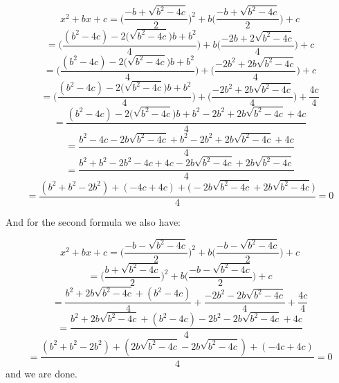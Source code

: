 \documentclass{article}
\begin{document}
\begin{equation*}
	x^{2} + bx + c = \Bigg(\frac{-b + \sqrt{b^{2} - 4c}}{2}\Bigg)^{2} + b\Bigg(\frac{-b + \sqrt{b^{2} - 4c}}{2}\Bigg) + c
\end{equation*}
\begin{equation*}
	= \Bigg(\frac{(b^{2} - 4c) - 2\Big(\sqrt{b^{2} - 4c}\Big)b + b^{2}}{4}\Bigg) + b\Bigg(\frac{-2b + 2\sqrt{b^{2} - 4c}}{4}\Bigg) + c
\end{equation*}
\begin{equation*}
	= \Bigg(\frac{(b^{2} - 4c) - 2\Big(\sqrt{b^{2} - 4c}\Big)b + b^{2}}{4}\Bigg) + \Bigg(\frac{-2b^{2} + 2b\sqrt{b^{2} - 4c}}{4}\Bigg) + c
\end{equation*}
\begin{equation*}
	= \Bigg(\frac{(b^{2} - 4c) - 2\Big(\sqrt{b^{2} - 4c}\Big)b + b^{2}}{4}\Bigg) + \Bigg(\frac{-2b^{2} + 2b\sqrt{b^{2} - 4c}}{4}\Bigg) + \frac{4c}{4}
\end{equation*}
\begin{equation*}
	= \frac{(b^{2} - 4c) - 2\Big(\sqrt{b^{2} - 4c}\Big)b + b^{2} - 2b^{2} + 2b\sqrt{b^{2} - 4c} + 4c}{4}
\end{equation*}
\begin{equation*}
	= \frac{b^{2} - 4c - 2b\sqrt{b^{2} - 4c} + b^{2} - 2b^{2} + 2b\sqrt{b^{2} - 4c} + 4c}{4}
\end{equation*}
\begin{equation*}
	= \frac{b^{2} + b^{2} - 2b^{2} - 4c + 4c - 2b\sqrt{b^{2} - 4c} + 2b\sqrt{b^{2} - 4c}}{4}
\end{equation*}
\begin{equation*}
	= \frac{(b^{2} + b^{2} - 2b^{2}) + (- 4c + 4c) + \Big(-2b\sqrt{b^{2} - 4c} + 2b\sqrt{b^{2} - 4c}\Big)}{4} = 0
\end{equation*}

And for the second formula we also have:

\begin{equation*}
	x^{2} + bx + c = \Bigg(\frac{-b - \sqrt{b^{2} - 4c}}{2}\Bigg)^{2} + b\Bigg(\frac{-b - \sqrt{b^{2} - 4c}}{2}\Bigg) + c
\end{equation*}
\begin{equation*}
	= \Bigg(\frac{b + \sqrt{b^{2} - 4c}}{2}\Bigg)^{2} + b\Bigg(\frac{-b - \sqrt{b^{2} - 4c}}{2}\Bigg) + c
\end{equation*}
\begin{equation*}
	= \frac{b^{2} + 2b\sqrt{b^{2} - 4c} + (b^{2} - 4c)}{4} + \frac{-2b^{2} - 2b\sqrt{b^{2} - 4c}}{4} + \frac{4c}{4}
\end{equation*}
\begin{equation*}
	= \frac{b^{2} + 2b\sqrt{b^{2} - 4c} + (b^{2} - 4c) -2b^{2} - 2b\sqrt{b^{2} - 4c} + 4c}{4}
\end{equation*}
\begin{equation*}
	= \frac{(b^{2} + b^{2} - 2b^{2}) + (2b\sqrt{b^{2} - 4c} - 2b\sqrt{b^{2} - 4c}) + (-4c + 4c)}{4} = 0
\end{equation*}
and we are done.
\end{document}
